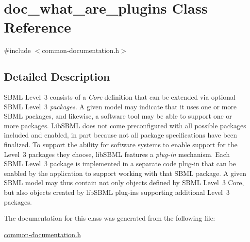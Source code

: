 \hypertarget{classdoc__what__are__plugins}{}\section{doc\+\_\+what\+\_\+are\+\_\+plugins Class Reference}
\label{classdoc__what__are__plugins}


{\ttfamily \#include $<$common-\/documentation.\+h$>$}



\subsection{Detailed Description}
\begin{DoxyParagraph}{}
S\+B\+ML Level~3 consists of a {\itshape Core} definition that can be extended via optional S\+B\+ML Level~3 {\itshape packages}. A given model may indicate that it uses one or more S\+B\+ML packages, and likewise, a software tool may be able to support one or more packages. Lib\+S\+B\+ML does not come preconfigured with all possible packages included and enabled, in part because not all package specifications have been finalized. To support the ability for software systems to enable support for the Level~3 packages they choose, lib\+S\+B\+ML features a {\itshape plug-\/in} mechanism. Each S\+B\+ML Level~3 package is implemented in a separate code plug-\/in that can be enabled by the application to support working with that S\+B\+ML package. A given S\+B\+ML model may thus contain not only objects defined by S\+B\+ML Level~3 Core, but also objects created by lib\+S\+B\+ML plug-\/ins supporting additional Level~3 packages. 
\end{DoxyParagraph}


The documentation for this class was generated from the following file\+:\begin{DoxyCompactItemize}
\item 
\hyperlink{common-documentation_8h}{common-\/documentation.\+h}\end{DoxyCompactItemize}
